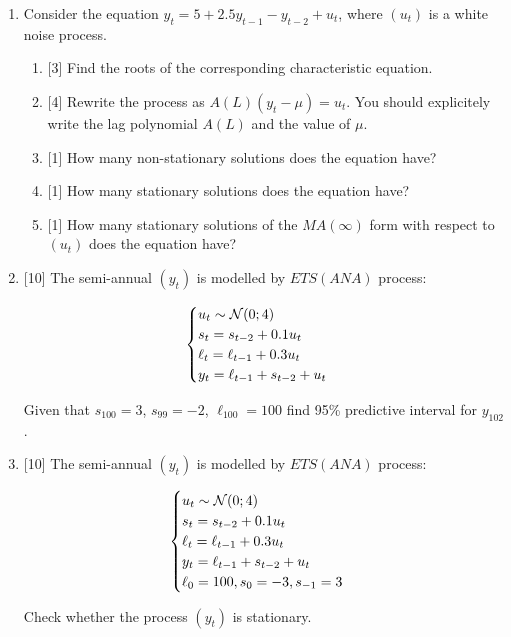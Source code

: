 \begin{enumerate}
\item Consider the equation $y_t = 5 + 2.5 y_{t-1} - y_{t-2} + u_t$, where $(u_t)$ is a white noise process. 
\begin{enumerate}
\item {[3]} Find the roots of the corresponding characteristic equation. 
\item {[4]} Rewrite the process as $A(L)(y_t - \mu) = u_t$. 
You should explicitely write the lag polynomial $A(L)$ and the value of $\mu$.
\item {[1]} How many non-stationary solutions does the equation have?
\item {[1]} How many stationary solutions does the equation have?
\item {[1]} How many stationary solutions of the $MA(\infty)$ form with respect to $(u_t)$ does the equation have?
\end{enumerate}

\item {[10]} The semi-annual $(y_t)$ is modelled by $ETS(ANA)$ process:

\[
\begin{cases}
    u_t \sim \mathcal{N}(0; 4) \\
    s_t = s_{t-2} + 0.1 u_t \\
    \ell_t = \ell_{t-1} + 0.3 u_t \\
    y_t = \ell_{t-1} + s_{t-2} + u_t \\
\end{cases}    
\]

Given that $s_{100} = 3$, $s_{99} = -2$, $\ell_{100} = 100$ find 95\% predictive interval for $y_{102}$. 


\item {[10]} The semi-annual $(y_t)$ is modelled by $ETS(ANA)$ process:

\[
\begin{cases}
    u_t \sim \mathcal{N}(0; 4) \\
    s_t = s_{t-2} + 0.1 u_t \\
    \ell_t = \ell_{t-1} + 0.3 u_t \\
    y_t = \ell_{t-1} + s_{t-2} + u_t \\
    \ell_0 = 100, s_0 = -3, s_{-1} = 3 \\
\end{cases}    
\]

Check whether the process $(y_t)$ is stationary. 

    

\end{enumerate}



